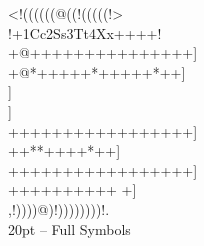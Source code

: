\documentclass[12pt]{article}
\begin{document}
\begin{center}
{
{
\gnos%
<!((((((@((!(((((!>\\
!+1Cc2Ss3Tt4Xx++++!\\
+@+++++++++++++++]\\
+@*+++++*+++++*++]\\}
{\gnosb{}}{\gnos]\\}
{\gnosw{}}{\gnos]\\
+++++++++++++++++]\\
++*{\gnoswi{}}{\gnoswii{}}{\gnoswiii{}}{\gnosbi{}}{\gnosbii{}}{\gnosbiii{}}*++++*++]\\
+++++++++++++++++]\\
++++++++++%
%
+]\\
,!))))@)!))))))))!.\\
}}
20pt -- Full Symbols
\end{center}

\newpage
\end{document}
